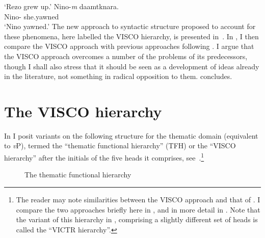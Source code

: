 \documentclass[output=paper]{langsci/langscibook}
\begin{document}
        \glt    \enquote*{Rezo grew up.} \parencite[293]{Harris1982}
    \ex
        \gll    Nino-\textit{m} daamtknara.\\
                Nino-\Erg{} she.yawned\\
        \glt    \enquote*{Nino yawned.} \parencite[147]{Harris1981}
    \z
\z
The new approach to syntactic structure proposed to account for these
phenomena, here labelled the VISCO hierarchy, is presented
in~.  In , I then compare the VISCO approach with previous
approaches  following  . I
argue that the VISCO approach overcomes a number of the problems of its
predecessors, though I shall also stress that it should be seen as a
development of ideas already in the literature, not something in radical
opposition to them.  concludes.

\section{The VISCO hierarchy}\label{sec:visco}

In \textcite{Baker2016,Baker2018,Baker2019} I posit variants on the following
structure for the thematic domain (equivalent to \emph{v}P), termed the
\enquote{thematic functional hierarchy} (\gls{TFH}) or the
\enquote{VISCO hierarchy} after the initials of the five heads it
comprises, see~.\footnote{The reader may note similarities between the VISCO approach
    and that of \citet{Ramchand2008}. I compare the two approaches briefly here
    in , and in more detail in \citet{Baker2018}. Note that the variant
of this hierarchy in \textcite{Baker2018}, comprising a slightly different
set of heads is called the \enquote{VICTR hierarchy}.}

\begin{figure}
    \caption{The thematic functional hierarchy\label{fig:baker:2}}
\end{figure}
\end{document}
